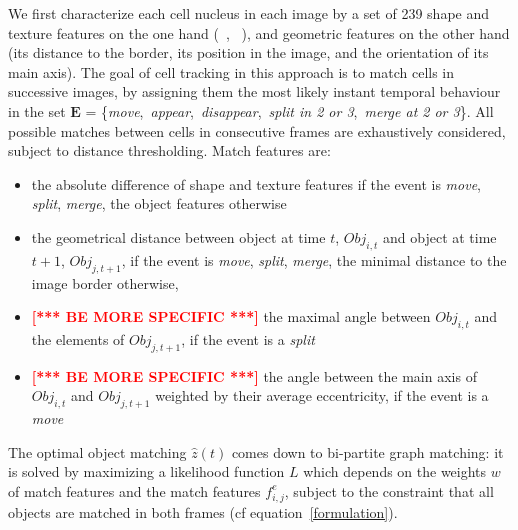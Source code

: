 We first characterize each cell nucleus in each image by a set of 239 shape and texture features on the one hand (~\cite{Walter2010}, ~\cite{cellcognition}), and geometric features on the other hand (its distance to the border, its position in the image, and the orientation of its main axis). The goal of cell tracking in this approach is to match cells in successive images, by assigning
them the most likely instant temporal behaviour in the set $\mathbf{E}$ = \{\textit{move},~\textit{appear},~\textit{disappear},~\textit{split in 2 or 3},~\textit{merge at 2 or 3}\}. All possible matches between
cells in consecutive frames are exhaustively considered, subject to
distance thresholding. Match features are: 
\begin{itemize}
\item the absolute difference of shape and texture features if the event is \textit{move}, \textit{split}, \textit{merge}, the object features otherwise
\item the geometrical distance between object at time $t$, $Obj_{i, t}$ and object at time $t+1$, $Obj_{j, t+1}$, if the event is \textit{move}, \textit{split}, \textit{merge}, the minimal distance to the image border otherwise,
\item \textcolor{red}{\bf [*** BE MORE SPECIFIC ***]} the maximal angle between $Obj_{i, t}$ and the elements of $Obj_{j, t+1}$, if the event is a \textit{split}
\item  \textcolor{red}{\bf [*** BE MORE SPECIFIC ***]} the angle between the main axis of $Obj_{i, t}$ and $Obj_{j, t+1}$ weighted by their average eccentricity, if the event is a \textit{move}
\end{itemize}

The optimal object matching $\widehat{z}(t)$ comes down to bi-partite graph matching: it is solved by maximizing a likelihood function $L$ which depends on the weights $w$ of match features and the match features $f^e_{i, j}$, subject to the constraint that all objects are matched in both frames (cf equation~\ref{formulation}).

